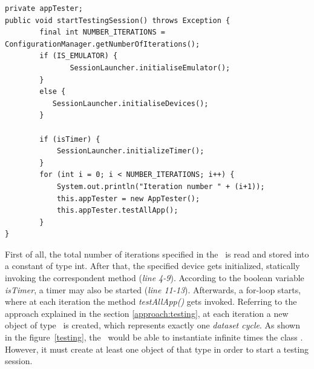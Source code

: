 \begin{lstlisting}[caption=\SessionLauncher\ Code snippet for starting a testing session ,label={lst:startsession}]
private appTester; 
public void startTestingSession() throws Exception {
        final int NUMBER_ITERATIONS = ConfigurationManager.getNumberOfIterations();
        if (IS_EMULATOR) {
        	   SessionLauncher.initialiseEmulator();
        }
        else {
       	   SessionLauncher.initialiseDevices();
        }
       
        if (isTimer) {
            SessionLauncher.initializeTimer();
        }
        for (int i = 0; i < NUMBER_ITERATIONS; i++) {
            System.out.println("Iteration number " + (i+1));
            this.appTester = new AppTester();
            this.appTester.testAllApp();
        }
}
\end{lstlisting}
First of all, the total number of iterations specified in the \Config\ is read and stored into a constant of type int. After that, the specified device gets initialized, statically invoking the correspondent method (\textit{line 4-9}).  
According to the boolean variable \textit{isTimer}, a timer may also be started (\textit{line 11-13}).
Afterwards, a for-loop starts, where at each iteration the method \textit{testAllApp()} gets invoked. 
Referring to the approach explained in the section \ref{approach:testing}, at each iteration a new object of type \AppTester\ is created, which represents exactly one \textit{dataset cycle}. 
As shown in the figure~\ref{testing}, the \SessionLauncher\ would be able to instantiate infinite times the class \AppTester. However, it must create at least one object of that type in order to start a testing session. 

